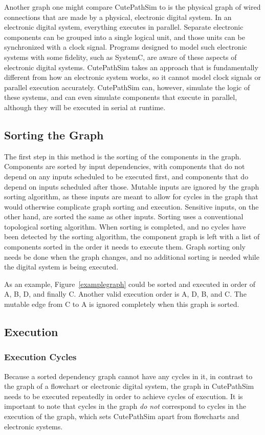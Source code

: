 \documentclass[12pt]{article}
\begin{document}
Another graph one might compare CutePathSim to is the physical graph of wired connections that are made by a physical, electronic digital system. In an electronic digital system, everything executes in parallel. Separate electronic components can be grouped into a single logical unit, and those units can be synchronized with a clock signal. Programs designed to model such electronic systems with some fidelity, such as SystemC, are aware of these aspects of electronic digital systems. CutePathSim takes an approach that is fundamentally different from how an electronic system works, so it cannot model clock signals or parallel execution accurately. CutePathSim can, however, simulate the logic of these systems, and can even simulate components that execute in parallel, although they will be executed in serial at runtime.

\subsection{Sorting the Graph}
The first step in this method is the sorting of the components in the graph. Components are sorted by input dependencies, with components that do not depend on any inputs scheduled to be executed first, and components that do depend on inputs scheduled after those. Mutable inputs are ignored by the graph sorting algorithm, as these inputs are meant to allow for cycles in the graph that would otherwise complicate graph sorting and execution. Sensitive inputs, on the other hand, are sorted the same as other inputs. Sorting uses a conventional topological sorting algorithm. When sorting is completed, and no cycles have been detected by the sorting algorithm, the component graph is left with a list of components sorted in the order it needs to execute them. Graph sorting only needs be done when the graph changes, and no additional sorting is needed while the digital system is being executed.

As an example, Figure~\ref{examplegraph} could be sorted and executed in order of A, B, D, and finally C. Another valid execution order is A, D, B, and C. The mutable edge from C to A is ignored completely when this graph is sorted.

\subsection{Execution}
\subsubsection{Execution Cycles}
Because a sorted dependency graph cannot have any cycles in it, in contrast to the graph of a flowchart or electronic digital system, the graph in CutePathSim needs to be executed repeatedly in order to achieve cycles of execution. It is important to note that cycles in the graph \textsl{do not} correspond to cycles in the execution of the graph, which sets CutePathSim apart from flowcharts and electronic systems.
\end{document}
